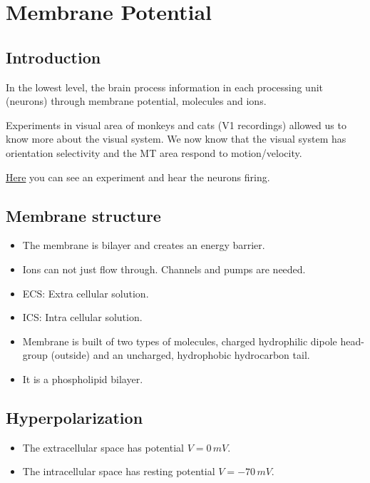 \documentclass[a4paper, 12pt]{article}
\begin{document}
\section{Membrane Potential}
\subsection{Introduction}
In the lowest level, the brain process information in each processing unit (neurons) through membrane potential, molecules and ions.

Experiments in visual area of monkeys and cats (V1 recordings) allowed us to know more about the visual system. We now know that the visual system has orientation selectivity and the MT area respond to motion/velocity.

\href{https://www.youtube.com/watch?v=8VdFf3egwfg}{Here} you can see an experiment and hear the neurons firing.

\subsection{Membrane structure}
\begin{itemize}[noitemsep,nolistsep]
	\item The membrane is bilayer and creates an energy barrier.
	\item Ions can not just flow through. Channels and pumps are needed.
	\item ECS: Extra cellular solution.
	\item ICS: Intra cellular solution.
	\item Membrane is built of two types of molecules, charged hydrophilic dipole head-group (outside) and an uncharged, hydrophobic hydrocarbon tail.
	\item It is a phospholipid bilayer.
\end{itemize}

\subsection{Hyperpolarization}
\begin{itemize}[noitemsep,nolistsep]
	\item The extracellular space has potential $V=0\,mV$.
	\item The intracellular space has resting potential $V=-70\,mV$.
\end{itemize}
\end{document}
